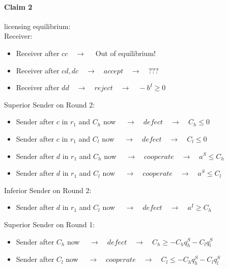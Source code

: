 \documentclass[11pt]{article}
\theoremstyle{plainCl1}
\begin{document}
\paragraph{Claim 2} licensing equilibrium:\\
Receiver:
\begin{itemize} [noitemsep]
	\item Receiver after $cc \quad \rightarrow \quad$ Out of equilibrium!\\
	\item Receiver after $cd, dc \quad \rightarrow \quad accept \quad \rightarrow \quad ???$\\
	\item Receiver after $dd \quad \rightarrow \quad reject \quad \rightarrow \quad -b^I \geq 0$\\
\end{itemize}
Superior Sender on Round 2:
\begin{itemize} [noitemsep]
	\item Sender after $c$ in $r_1$ and $C_h$ now $\quad \rightarrow \quad defect \quad \rightarrow \quad C_h \leq 0$\\
	\item Sender after $c$ in $r_1$ and $C_l$ now $\quad \rightarrow \quad defect \quad \rightarrow \quad C_l \leq 0$\\
	\item Sender  after $d$ in $r_1$ and $C_h$ now $\quad \rightarrow \quad cooperate \quad \rightarrow \quad a^S \leq C_h$\\
	\item Sender  after $d$ in $r_1$ and $C_l$ now $\quad \rightarrow \quad cooperate \quad \rightarrow \quad a^S \leq C_l$\\
\end{itemize}
Inferior Sender on Round 2:
\begin{itemize} [noitemsep]
	\item Sender  after $d$ in $r_1$ and $C_l$ now $\quad \rightarrow \quad defect \quad \rightarrow \quad a^I \geq C_h$\\
\end{itemize}
Superior Sender on Round 1:
\begin{itemize} [noitemsep]
	\item Sender after $C_h$ now $\quad \rightarrow \quad defect \quad \rightarrow \quad  C_h \geq -C_h q^S_h - C_l q^S_l$\\
	\item Sender after $C_l$ now $\quad \rightarrow \quad cooperate \quad \rightarrow \quad  C_l \leq -C_h q^S_h - C_l q^S_l$\\
\end{itemize}
\end{document}
